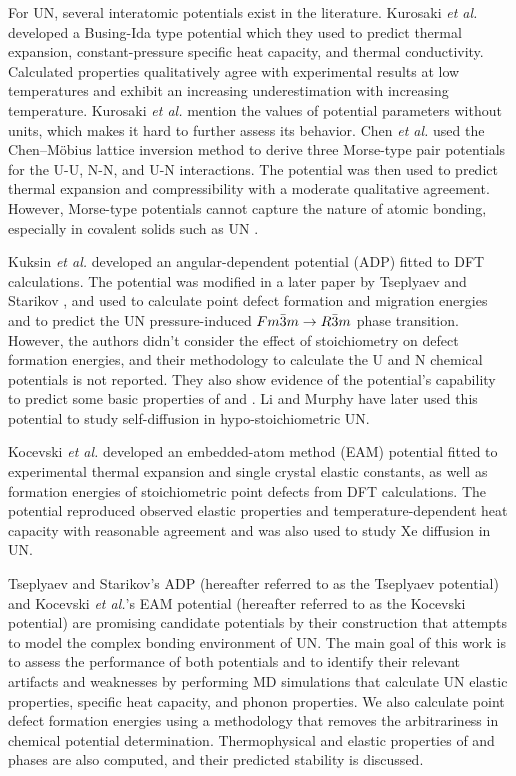 \documentclass[preprint, 12pt]{elsarticle}
\begin{document}
For UN, several interatomic potentials exist in the literature. Kurosaki \textit{et al.} \cite{Kurosaki2000I, Kurosaki2000II} developed a Busing-Ida type potential which they used to predict thermal expansion, constant-pressure specific heat capacity, and thermal conductivity. Calculated properties qualitatively agree with experimental results at low temperatures and exhibit an increasing underestimation with increasing temperature. Kurosaki \textit{et al.} mention the values of potential parameters without units, which makes it hard to further assess its behavior. Chen \textit{et al.} \cite{Chen2010} used the Chen–Möbius lattice inversion method to derive three Morse-type pair potentials for the U-U, N-N, and U-N interactions. The potential was then used to predict thermal expansion and compressibility with a moderate qualitative agreement. However, Morse-type potentials cannot capture the nature of atomic bonding, especially in covalent solids such as UN \cite{Mishin2005}.

Kuksin \textit{et al.} \cite{Kuksin2016} developed an angular-dependent potential (ADP) fitted to DFT calculations. The potential was modified in a later paper by Tseplyaev and Starikov \cite{Tseplyaev2016}, and used to calculate point defect formation and migration energies and to predict the UN pressure-induced $Fm\Bar{3}m \rightarrow R\Bar{3}m$ phase transition. However, the authors didn't consider the effect of stoichiometry on defect formation energies, and their methodology to calculate the U and N chemical potentials is not reported. They also show evidence of the potential's capability to predict some basic properties of  and . Li and Murphy \cite{Li2021} have later used this potential to study self-diffusion in hypo-stoichiometric UN.

Kocevski \textit{et al.} \cite{Kocevski2022II} developed an embedded-atom method (EAM) potential fitted to experimental thermal expansion and single crystal elastic constants, as well as formation energies of stoichiometric point defects from DFT calculations. The potential reproduced observed elastic properties and temperature-dependent heat capacity with reasonable agreement and was also used to study Xe diffusion in UN.

Tseplyaev and Starikov's ADP (hereafter referred to as the Tseplyaev potential) and Kocevski \textit{et al.}'s EAM potential (hereafter referred to as the Kocevski potential) are promising candidate potentials by their construction that attempts to model the complex bonding environment of UN. The main goal of this work is to assess the performance of both potentials and to identify their relevant artifacts and weaknesses by performing MD simulations that calculate UN elastic properties, specific heat capacity, and phonon properties. We also calculate point defect formation energies using a methodology that removes the arbitrariness in chemical potential determination. Thermophysical and elastic properties of  and  phases are also computed, and their predicted stability is discussed. 
\end{document}
